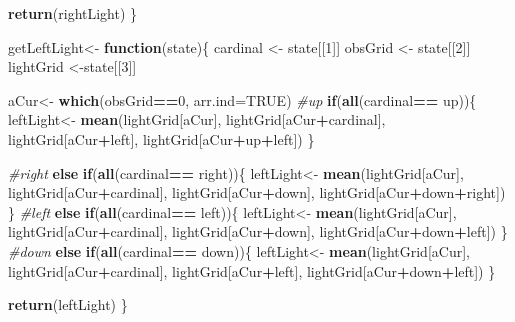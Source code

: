 \documentclass[]{article}
\newenvironment{Shaded}{\begin{snugshade}}{\end{snugshade}}
\newcommand{\CommentTok}[1]{\textcolor[rgb]{0.56,0.35,0.01}{\textit{#1}}}
\newcommand{\ControlFlowTok}[1]{\textcolor[rgb]{0.13,0.29,0.53}{\textbf{#1}}}
\newcommand{\DataTypeTok}[1]{\textcolor[rgb]{0.13,0.29,0.53}{#1}}
\newcommand{\DecValTok}[1]{\textcolor[rgb]{0.00,0.00,0.81}{#1}}
\newcommand{\KeywordTok}[1]{\textcolor[rgb]{0.13,0.29,0.53}{\textbf{#1}}}
\newcommand{\NormalTok}[1]{#1}
\newcommand{\OperatorTok}[1]{\textcolor[rgb]{0.81,0.36,0.00}{\textbf{#1}}}
\newcommand{\OtherTok}[1]{\textcolor[rgb]{0.56,0.35,0.01}{#1}}
\newcommand{\StringTok}[1]{\textcolor[rgb]{0.31,0.60,0.02}{#1}}
\begin{document}
\begin{Shaded}
\begin{Highlighting}[]
 
  
  \KeywordTok{return}\NormalTok{(rightLight)}
\NormalTok{\}}

\NormalTok{getLeftLight<-}\StringTok{ }\ControlFlowTok{function}\NormalTok{(state)\{}
\NormalTok{  cardinal <-}\StringTok{ }\NormalTok{state[[}\DecValTok{1}\NormalTok{]]}
\NormalTok{  obsGrid <-}\StringTok{ }\NormalTok{state[[}\DecValTok{2}\NormalTok{]]}
\NormalTok{  lightGrid <-state[[}\DecValTok{3}\NormalTok{]]}
  
\NormalTok{  aCur<-}\StringTok{ }\KeywordTok{which}\NormalTok{(obsGrid}\OperatorTok{==}\DecValTok{0}\NormalTok{, }\DataTypeTok{arr.ind=}\OtherTok{TRUE}\NormalTok{)}
  \CommentTok{#up}
  \ControlFlowTok{if}\NormalTok{(}\KeywordTok{all}\NormalTok{(cardinal}\OperatorTok{==}\StringTok{ }\NormalTok{up))\{}
\NormalTok{  leftLight<-}\StringTok{ }\KeywordTok{mean}\NormalTok{(lightGrid[aCur], lightGrid[aCur}\OperatorTok{+}\NormalTok{cardinal], lightGrid[aCur}\OperatorTok{+}\NormalTok{left], lightGrid[aCur}\OperatorTok{+}\NormalTok{up}\OperatorTok{+}\NormalTok{left])}
\NormalTok{  \}}
  
  \CommentTok{#right}
  \ControlFlowTok{else} \ControlFlowTok{if}\NormalTok{(}\KeywordTok{all}\NormalTok{(cardinal}\OperatorTok{==}\StringTok{ }\NormalTok{right))\{}
\NormalTok{     leftLight<-}\StringTok{ }\KeywordTok{mean}\NormalTok{(lightGrid[aCur], lightGrid[aCur}\OperatorTok{+}\NormalTok{cardinal], lightGrid[aCur}\OperatorTok{+}\NormalTok{down], lightGrid[aCur}\OperatorTok{+}\NormalTok{down}\OperatorTok{+}\NormalTok{right])}
\NormalTok{  \}}
  \CommentTok{#left}
    \ControlFlowTok{else} \ControlFlowTok{if}\NormalTok{(}\KeywordTok{all}\NormalTok{(cardinal}\OperatorTok{==}\StringTok{ }\NormalTok{left))\{}
\NormalTok{leftLight<-}\StringTok{ }\KeywordTok{mean}\NormalTok{(lightGrid[aCur], lightGrid[aCur}\OperatorTok{+}\NormalTok{cardinal], lightGrid[aCur}\OperatorTok{+}\NormalTok{down], lightGrid[aCur}\OperatorTok{+}\NormalTok{down}\OperatorTok{+}\NormalTok{left])}
\NormalTok{    \}}
  \CommentTok{#down}
    \ControlFlowTok{else} \ControlFlowTok{if}\NormalTok{(}\KeywordTok{all}\NormalTok{(cardinal}\OperatorTok{==}\StringTok{ }\NormalTok{down))\{}
\NormalTok{   leftLight<-}\StringTok{ }\KeywordTok{mean}\NormalTok{(lightGrid[aCur], lightGrid[aCur}\OperatorTok{+}\NormalTok{cardinal], lightGrid[aCur}\OperatorTok{+}\NormalTok{left], lightGrid[aCur}\OperatorTok{+}\NormalTok{down}\OperatorTok{+}\NormalTok{left])}
\NormalTok{  \}}
  
  \KeywordTok{return}\NormalTok{(leftLight)}
\NormalTok{\}}
\end{Highlighting}
\end{Shaded}
\end{document}
